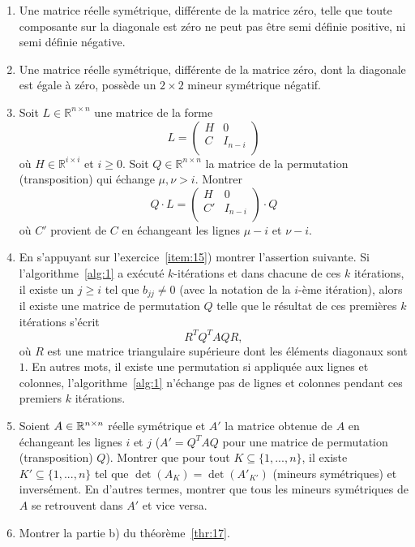 \begin{enumerate}
\item Une matrice réelle  symétrique, différente de la matrice zéro, telle que toute composante sur la diagonale est zéro ne peut pas être semi définie positive, ni semi définie négative. 
\item Une matrice réelle symétrique, différente de la matrice zéro, dont la diagonale est égale à zéro, possède un $2 ×2$ mineur symétrique négatif. \label{item:17}
\item Soit $L \in ℝ^{n × n}$ une matrice %
de la forme 
  \begin{displaymath}
L = \left(\begin{array}{c|c}
H & 0  \\
\hline
C  & I_{n-i} \\
\end{array}\right)
\end{displaymath}
où  $H ∈ ℝ^{i×i}$ et $i ≥0$. Soit $Q ∈ ℝ^{n ×n}$ la matrice de la permutation (transposition)  qui échange $μ, ν > i$. Montrer 
\begin{displaymath}
  Q \cdot L = \left(\begin{array}{c|c}
H & 0  \\
\hline
C'  & I_{n-i} \\
\end{array}\right) \cdot Q
\end{displaymath}
où $C'$ provient de $C$ en échangeant les lignes $μ-i$ et $ν-i$. 
\label{item:15}
\item \label{item:16}
En s'appuyant sur l'exercice~\ref{item:15}) montrer l'assertion suivante. Si l'algorithme~\ref{alg:1} a exécuté $k$-itérations et dans chacune de ces $k$ itérations, il existe un $j ≥i$ tel que  $b_{jj} \neq 0$ (avec la notation de la $i$-ème itération), alors il existe une matrice de permutation $Q$ telle que le résultat de ces premières $k$ itérations s'écrit 
\begin{displaymath}
  R^T Q^T A Q R, 
\end{displaymath}
où $R$ est une matrice triangulaire supérieure dont les éléments diagonaux sont $1$.  En autres mots, il existe une permutation si appliquée aux lignes et colonnes, l'algorithme~\ref{alg:1} n'échange pas de lignes et colonnes pendant ces premiers $k$ itérations. 
\item Soient $A \in \Bbb R^{n \times n}$ réelle symétrique et $A'$ la matrice obtenue de $A$ en échangeant les lignes $i$ et $j$ ($A' = Q^T A Q$ pour une matrice de permutation (transposition) $Q$). Montrer que pour tout $K \subseteq \{1, ..., n\}$, il existe $K' \subseteq \{1, ..., n\}$ tel que $\det(A_K) = \det(A'_{K'})$ (mineurs symétriques) et inversément. En d'autres termes, montrer que tous les mineurs symétriques de $A$ se retrouvent dans $A'$ et vice versa.
\item Montrer la partie b) du théorème~\ref{thr:17}. 


\end{enumerate}
